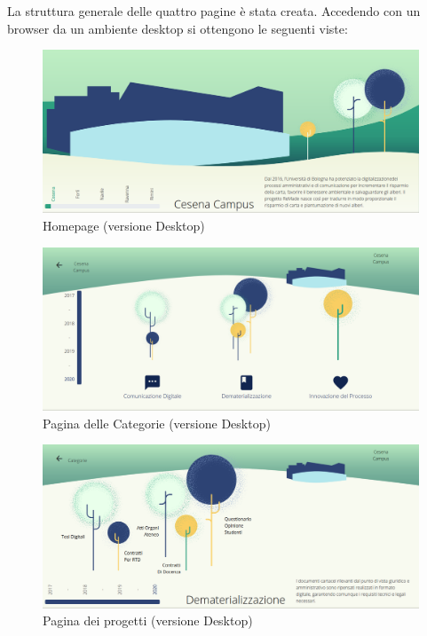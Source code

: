 \noindent La struttura generale delle quattro pagine è stata creata. Accedendo con un browser da un ambiente desktop si ottengono le seguenti viste:
\begin{figure}[H]
    \centering
    \includegraphics[width=0.9\linewidth]{img/first.png}
    \caption{Homepage (versione Desktop)}
    \label{fig:homeDesk}
\end{figure}

\begin{figure}[H]
    \centering
    \includegraphics[width=0.9\linewidth]{img/second.png}
    \caption{Pagina delle Categorie (versione Desktop)}
    \label{fig:catDesktop}
\end{figure}

\begin{figure}[H]
    \centering
    \includegraphics[width=0.9\linewidth]{img/third.png}
    \caption{Pagina dei progetti (versione Desktop)}
    \label{fig:projDesk}
\end{figure}

